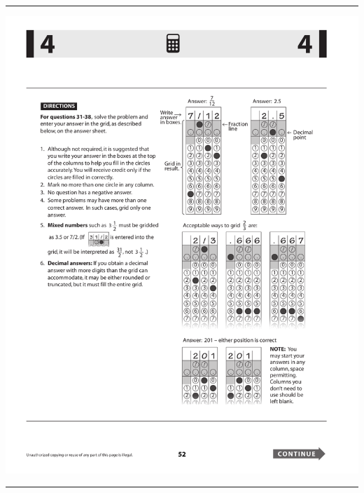 
{\selectfont
\enlargethispage{2cm}

\hspace*{32mm}
\hrule height 1pt



\vspace*{4mm}

\includegraphics{support/sat_calcon_grid-in_instructions.pdf}

\vspace*{4mm}

\hrule height 1pt
}

\clearpage

